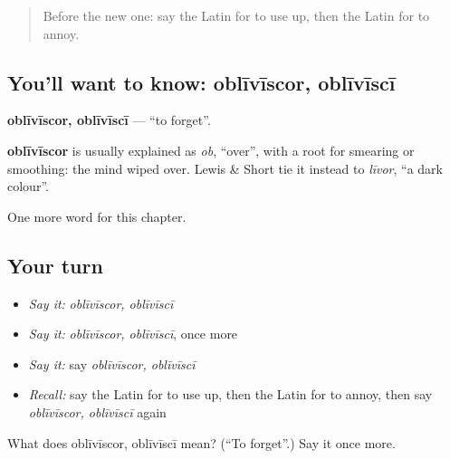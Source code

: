 \label{lesson:LA-C203-obliviscor}



\begin{quote}
Before the new one: say the Latin for to use up, then the Latin for to annoy.
\end{quote}

\subsection*{You'll want to know: oblīvīscor, oblīvīscī}
\textbf{oblīvīscor, oblīvīscī} — \textquotedblleft{}to forget\textquotedblright{}.

\begin{cousinweb}
\textbf{oblīvīscor} is usually explained as \emph{ob}, \textquotedblleft{}over\textquotedblright{}, with a root for smearing or smoothing: the mind wiped over. Lewis \& Short tie it instead to \emph{līvor}, \textquotedblleft{}a dark colour\textquotedblright{}.
\end{cousinweb}

\begin{grammarlens}[title={What you've built}]
One more word for this chapter.
\end{grammarlens}

\subsection*{Your turn}
\begin{itemize}
\raggedright
  \item \emph{Say it:} \emph{oblīvīscor, oblīvīscī}
  \item \emph{Say it:} \emph{oblīvīscor, oblīvīscī}, once more
  \item \emph{Say it:} say \emph{oblīvīscor, oblīvīscī}
  \item \emph{Recall:} say the Latin for to use up, then the Latin for to annoy, then say \emph{oblīvīscor, oblīvīscī} again
\end{itemize}

\begin{tcolorbox}[breakable,colback=teal!4,colframe=teal!35!black,title={Before you move on}]
What does oblīvīscor, oblīvīscī mean? (\textquotedblleft{}To forget\textquotedblright{}.) Say it once more.
\end{tcolorbox}
